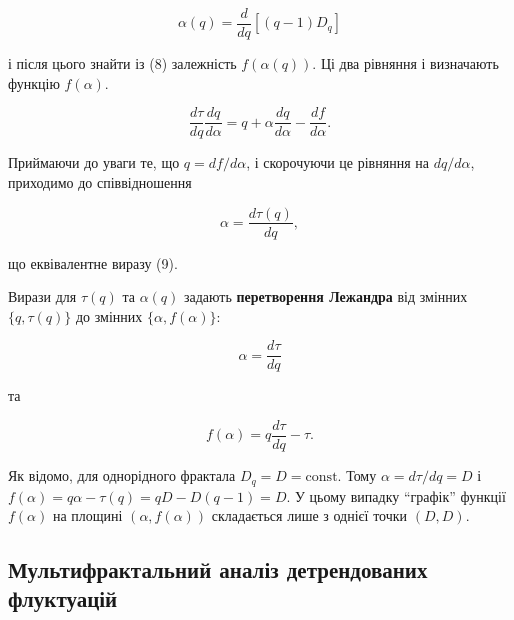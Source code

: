 \documentclass[
  letterpaper,
]{report}
\begin{document}
\[\tag{9}
\alpha(q) = \frac{d}{dq}[(q-1)D_{q}]
\]

і після цього знайти із (8) залежність \(f(\alpha(q))\). Ці два рівняння
і визначають функцію \(f(\alpha)\).

\[
\frac{d\tau}{dq}\frac{dq}{d\alpha} = q + \alpha\frac{dq}{d\alpha} - \frac{df}{d\alpha}.
\]

Приймаючи до уваги те, що \(q=df/d\alpha\), і скорочуючи це рівняння на
\(dq/d\alpha\), приходимо до співвідношення

\[
\alpha = \frac{d\tau(q)}{dq}, 
\]

що еквівалентне виразу (9).

Вирази для \(\tau(q)\) та \(\alpha(q)\) задають \textbf{перетворення
Лежандра} від змінних \(\{ q, \tau(q) \}\) до змінних
\(\{\alpha, f(\alpha)\}\):

\[\tag{10}
\alpha = \frac{d\tau}{dq}
\]

та

\[\tag{11}
f(\alpha) = q\frac{d\tau}{dq} - \tau.
\]

Як відомо, для однорідного фрактала \(D_{q}=D=\text{const}\). Тому
\(\alpha=d\tau/dq=D\) і \(f(\alpha)=q\alpha-\tau(q)=qD-D(q-1)=D\). У
цьому випадку ``графік'' функції \(f(\alpha)\) на площині
\(\left( \alpha, f(\alpha) \right)\) складається лише з однієї точки
\(\left( D, D \right)\).

\hypertarget{ux43cux443ux43bux44cux442ux438ux444ux440ux430ux43aux442ux430ux43bux44cux43dux438ux439-ux430ux43dux430ux43bux456ux437-ux434ux435ux442ux440ux435ux43dux434ux43eux432ux430ux43dux438ux445-ux444ux43bux443ux43aux442ux443ux430ux446ux456ux439}{%
\subsection{Мультифрактальний аналіз детрендованих
флуктуацій}\label{ux43cux443ux43bux44cux442ux438ux444ux440ux430ux43aux442ux430ux43bux44cux43dux438ux439-ux430ux43dux430ux43bux456ux437-ux434ux435ux442ux440ux435ux43dux434ux43eux432ux430ux43dux438ux445-ux444ux43bux443ux43aux442ux443ux430ux446ux456ux439}}
\end{document}
